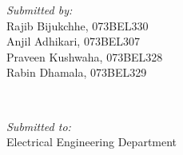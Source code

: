 \begin{titlepage}
	\begin{minipage}{0.4\textwidth}
		\begin{flushleft} 
			\emph{Submitted by:}\\
			Rajib Bijukchhe, 073BEL330\\
			Anjil Adhikari, 073BEL307\\
			Praveen Kushwaha, 073BEL328\\
			Rabin Dhamala, 073BEL329\\
		\end{flushleft}
	\end{minipage}
	~
	\begin{minipage}{0.4\textwidth}
		\begin{flushright} 
			\emph{Submitted to:} \\
			Electrical Engineering Department \\
		\end{flushright}
	\end{minipage}\\[2cm]







	\vfill %
\end{titlepage}

